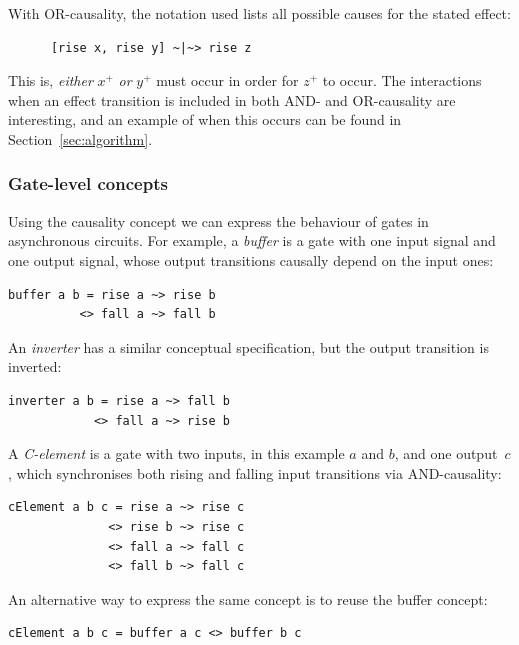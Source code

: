 \documentclass[british,conference,compsoc]{IEEEtran}
\begin{document}
With OR-causality, the notation used lists all possible causes for the stated 
effect:

\begin{verbatim}
      [rise x, rise y] ~|~> rise z
\end{verbatim}

This is, \emph{either} $x^{+}$ \emph{or} $y^{+}$ must occur in order for 
$z^{+}$ to occur. The interactions when an effect transition is included in both AND- and 
OR-causality are interesting, and an example of when this occurs can be found 
in Section~\ref{sec:algorithm}.

\vspace{-2mm}

\subsubsection{Gate-level concepts \label{subsub:gate-level}} Using the causality concept we can express
the behaviour of gates in asynchronous circuits. For example, a \emph{buffer}
is a gate with one input signal and one output signal,
whose output transitions causally depend on the input ones:

\begin{verbatim}
buffer a b = rise a ~> rise b 
          <> fall a ~> fall b
\end{verbatim}

\noindent An \emph{inverter} has a similar conceptual specification, but the
output transition is inverted:

\begin{verbatim}
inverter a b = rise a ~> fall b
            <> fall a ~> rise b
\end{verbatim}

\noindent A \emph{C-element} is a gate with two inputs, in this example $a$ and $b$, and one
output~$c$, which synchronises both rising and falling input transitions
via AND-causality:

\begin{verbatim}
cElement a b c = rise a ~> rise c 
              <> rise b ~> rise c
              <> fall a ~> fall c 
              <> fall b ~> fall c
\end{verbatim}

An alternative way to express the same concept is to reuse the buffer concept:

\begin{verbatim}
cElement a b c = buffer a c <> buffer b c
\end{verbatim}
\end{document}
